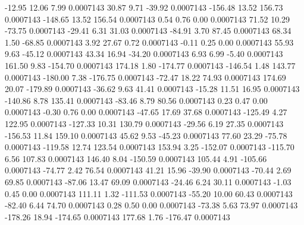       -12.95       12.06        7.99     0.0007143
       30.87        9.71      -39.92     0.0007143
     -156.48       13.52      156.73     0.0007143
     -148.65       13.52      156.54     0.0007143
        0.54        0.76        0.00     0.0007143
       71.52       10.29      -73.75     0.0007143
      -29.41        6.31       31.03     0.0007143
      -84.91        3.70       87.45     0.0007143
       68.34        1.50      -68.85     0.0007143
        3.92       27.67        0.72     0.0007143
       -0.11        0.25        0.00     0.0007143
       55.93        9.63      -45.12     0.0007143
       43.34       16.94      -34.20     0.0007143
        6.93        6.99       -5.40     0.0007143
      161.50        9.83     -154.70     0.0007143
      174.18        1.80     -174.77     0.0007143
     -146.54        1.48      143.77     0.0007143
     -180.00        7.38     -176.75     0.0007143
      -72.47       18.22       74.93     0.0007143
      174.69       20.07     -179.89     0.0007143
      -36.62        9.63       41.41     0.0007143
      -15.28       11.51       16.95     0.0007143
     -140.86        8.78      135.41     0.0007143
      -83.46        8.79       80.56     0.0007143
        0.23        0.47        0.00     0.0007143
       -0.30        0.76        0.00     0.0007143
      -47.65       17.69       37.68     0.0007143
     -125.49        4.27      122.95     0.0007143
     -127.33       10.31      130.79     0.0007143
      -29.56        6.19       27.35     0.0007143
     -156.53       11.84      159.10     0.0007143
       45.62        9.53      -45.23     0.0007143
       77.60       23.29      -75.78     0.0007143
     -119.58       12.74      123.54     0.0007143
      153.94        3.25     -152.07     0.0007143
     -115.70        6.56      107.83     0.0007143
      146.40        8.04     -150.59     0.0007143
      105.44        4.91     -105.66     0.0007143
      -74.77        2.42       76.54     0.0007143
       41.21       15.96      -39.90     0.0007143
      -70.44        2.69       69.85     0.0007143
      -87.06       13.47       69.09     0.0007143
      -24.46        6.24       30.11     0.0007143
       -1.03        0.45        0.00     0.0007143
      111.11        1.32     -111.53     0.0007143
      -55.20       10.00       60.43     0.0007143
      -82.40        6.44       74.70     0.0007143
        0.28        0.50        0.00     0.0007143
      -73.38        5.63       73.97     0.0007143
     -178.26       18.94     -174.65     0.0007143
      177.68        1.76     -176.47     0.0007143
